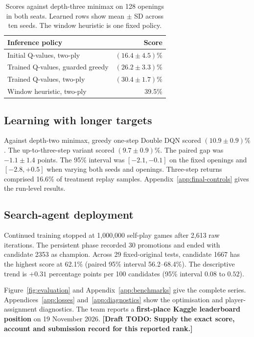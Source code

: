 \documentclass[letterpaper]{article}
\newcommand{\drafttodo}[1]{\textcolor{red!65!black}{\textbf{[Draft TODO: #1]}}}
\begin{document}
\begin{table}[!htbp]
\centering\small
\caption{Scores against depth-three minimax on 128 openings in both seats. Learned rows show mean $\pm$ SD across ten seeds. The window heuristic is one fixed policy.}
\label{tab:lookahead}
\begin{tabular}{@{}lr@{}}
\toprule
Inference policy & Score\\
\midrule
Initial Q-values, two-ply & $(16.4\pm4.5)\%$\\
Trained Q-values, guarded greedy & $(26.2\pm3.3)\%$\\
Trained Q-values, two-ply & $(30.4\pm1.7)\%$\\
Window heuristic, two-ply & 39.5\%\\
\bottomrule
\end{tabular}
\end{table}

\subsection{Learning with longer targets}
Against depth-two minimax, greedy one-step Double DQN scored
$(10.9\pm0.9)\%$. The up-to-three-step variant scored
$(9.7\pm0.9)\%$. The paired gap was $-1.1\pm1.4$ points.
The 95\% interval was $[-2.1,-0.1]$ on the fixed openings and
$[-2.8,+0.5]$ when varying both seeds and
openings. Three-step returns comprised 16.6\% of treatment
replay samples. Appendix~\ref{app:final-controls} gives the run-level results.

\subsection{Search-agent deployment}
Continued training stopped at 1,000,000 self-play games after 2,613 raw iterations. The persistent phase recorded 30 promotions and ended with candidate 2353 as champion. Across 29 fixed-original tests, candidate 1667 has the highest score at 62.1\% (paired 95\% interval 56.2--68.4\%). The descriptive trend is $+0.31$ percentage points per 100 candidates (95\% interval $0.08$ to $0.52$).

Figure~\ref{fig:evaluation} and Appendix~\ref{app:benchmarks} give the complete
series. Appendices~\ref{app:losses} and~\ref{app:diagnostics} show the
optimisation and player-assignment diagnostics. The team reports a \textbf{first-place Kaggle leaderboard position}
on 19 November 2026. \drafttodo{Supply the exact score, account and
submission record for this reported rank.}
\end{document}
